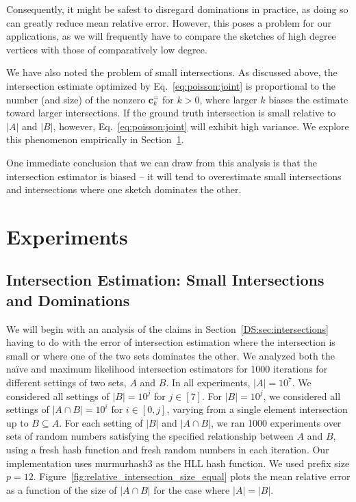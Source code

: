 \documentclass[10]{article}
\newcommand{\algoname}[1]{\textnormal{\textsc{#1}}}
\begin{document}
Consequently, it might be safest to disregard dominations in practice, as doing so can greatly reduce mean relative error.
However, this poses a problem for our applications, as we will frequently have to compare the sketches of high degree vertices with those of comparatively low degree. 

We have also noted the problem of small intersections. 
As discussed above, the intersection estimate optimized by Eq.~\eqref{eq:poisson:joint} is proportional to the number (and size) of the nonzero $\mathbf{c}^{=}_k$ for $k>0$, where larger $k$ biases the estimate toward larger intersections. 
If the ground truth intersection is small relative to $|A|$ and $|B|$, however, Eq.~\eqref{eq:poisson:joint} will exhibit high variance.
We explore this phenomenon empirically in Section~\ref{DS:sec:experiments}.

One immediate conclusion that we can draw from this analysis is that the intersection estimator is biased -- it will tend to overestimate small intersections and intersections where one sketch dominates the other.


\section{Experiments}
 \label{DS:sec:experiments}

\subsection{Intersection Estimation: Small Intersections and Dominations}
 \label{DS:sec:experiments:intersection}

\noindent
We will begin with an analysis of the claims in Section~\ref{DS:sec:intersections} having to do with the error of intersection estimation where the intersection is small or where one of the two sets dominates the other.
We analyzed both the na\"ive and maximum likelihood intersection estimators for 1000 iterations for different settings of two sets, $A$ and $B$. 
In all experiments, $|A| = 10^7$.
We considered all settings of $|B| = 10^j$ for $j \in [7]$.
For $|B| = 10^j$, we considered all settings of $|A \cap B| = {10^i}$ for $i \in [0, j]$, varying from a single element intersection up to $B \subseteq A$. 
For each setting of $|B|$ and $|A \cap B|$, we ran 1000 experiments over sets of random numbers satisfying the specified relationship between $A$ and $B$, using a fresh hash function and fresh random numbers in each iteration.
Our implementation uses murmurhash3 \cite{murmurhash3} as the \algoname{HLL} hash function.
We used prefix size $p=12$.
Figure~\ref{fig:relative_intersection_size_equal} plots the mean relative error as a function of the size of $|A \cap B|$ for the case where $|A| = |B|$. 
\end{document}
